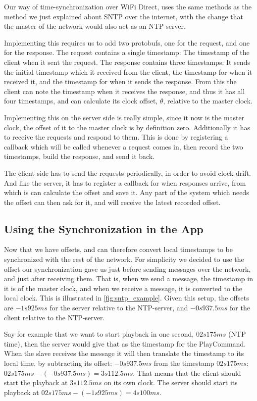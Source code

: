 Our way of time-synchronization over WiFi Direct, uses the same methods as the method we just explained about \ac{SNTP} over the internet, with the change that the master of the network would also act as an \ac{NTP}-server.

Implementing this requires us to add two protobufs, one for the request, and one for the response.
The request contains a single timestamp: The timestamp of the client when it sent the request.
The response contains three timestamps: It sends the initial timestamp which it received from the client, the timestamp for when it received it, and the timestamp for when it sends the response.
From this the client can note the timestamp when it receives the response, and thus it has all four timestamps, and can calculate its clock offset, $\theta$, relative to the master clock.

Implementing this on the server side is really simple, since it now is the master clock, the offset of it to the master clock is by definition zero.
Additionally it has to receive the requests and respond to them.
This is done by registering a callback which will be called whenever a request comes in, then record the two timestamps, build the response, and send it back.

The client side has to send the requests periodically, in order to avoid clock drift.
And like the server, it has to register a callback for when responses arrive, from which is can calculate the offset and save it.
Any part of the system which needs the offset can then ask for it, and will receive the latest recorded offset.

\subsection{Using the Synchronization in the App}
Now that we have offsets, and can therefore convert local timestamps to be synchronized with the rest of the network.
For simplicity we decided to use the offset our synchronization gave us just before sending messages over the network, and just after receiving them.
That is, when we send a message, the timestamp in it is of the master clock, and when we receive a message, it is converted to the local clock.
This is illustrated in \ref{fig:sntp_example}.
Given this setup, the offsets are $-1s925ms$ for the server relative to the \ac{NTP}-server, and $-0s937.5ms$ for the client relative to the \ac{NTP}-server.

Say for example that we want to start playback in one second, $02s175ms$ (\ac{NTP} time), then the server would give that as the timestamp for the PlayCommand.
When the slave receives the message it will then translate the timestamp to its local time, by subtracting its offset:
$-0s937.5ms$ from the timestamp $02s175ms$: $02s175ms - (-0s937.5ms) = 3s112.5ms$.
That means that the client should start the playback at $3s112.5ms$ on its own clock.
The server should start its playback at $02s175ms - (-1s925ms) = 4s100ms.$


